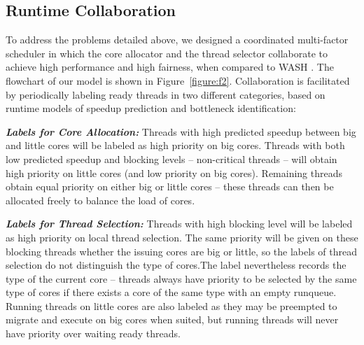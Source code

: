 \subsection{Runtime Collaboration}
To address the problems detailed above, we designed a coordinated multi-factor scheduler in which the core allocator and the thread selector collaborate to achieve high performance and high fairness, when compared to %
WASH \cite{jibaja2016portable}.
The flowchart of our model is shown in Figure~\ref{figure:f2}. 
Collaboration is facilitated by periodically labeling ready threads in two different categories, based on runtime models of speedup prediction and bottleneck identification: 

\textbf{\textit{Labels for Core Allocation:}}
Threads with high predicted speedup between big and little cores will be labeled as high priority on big cores. Threads with both low predicted speedup and blocking levels -- non-critical threads -- will obtain high priority on little cores (and low priority on big cores). Remaining threads obtain equal priority on either big or little cores -- these threads can then be allocated freely to balance the load of cores.

\textbf{\textit{Labels for Thread Selection:}}
Threads with high blocking level will be labeled as high priority on local thread selection. The same priority will be given on these blocking threads whether the issuing cores are big or little, so the labels of thread selection do not distinguish the type of cores.The label nevertheless records the type of the current core -- threads always have priority to be selected by the same type of cores if there exists a core of the same type with an empty runqueue. Running threads on little cores are also labeled as they may be preempted to migrate and execute on big cores when suited, but running threads will never have priority over waiting ready threads. 



